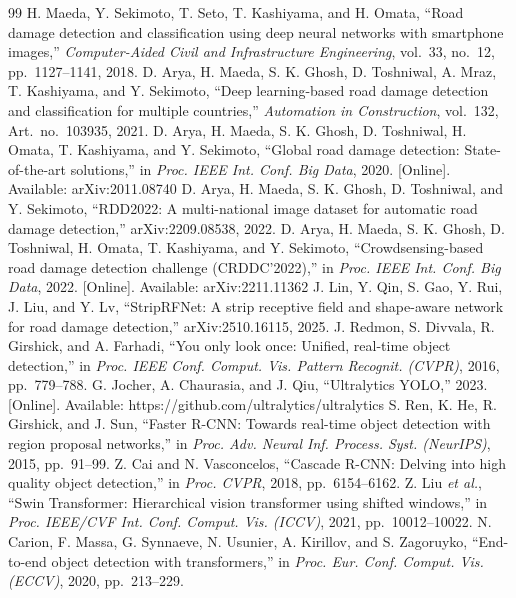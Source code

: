 \IfFileExists{IEEEtran.cls}{\documentclass[conference]{IEEEtran}}%
\begin{document}
\begin{thebibliography}{99}\small
{} H. Maeda, Y. Sekimoto, T. Seto, T. Kashiyama, and H. Omata, ``Road damage detection and classification using deep neural networks with smartphone images,'' \emph{Computer-Aided Civil and Infrastructure Engineering}, vol.~33, no.~12, pp.~1127--1141, 2018.
 D. Arya, H. Maeda, S. K. Ghosh, D. Toshniwal, A. Mraz, T. Kashiyama, and Y. Sekimoto, ``Deep learning-based road damage detection and classification for multiple countries,'' \emph{Automation in Construction}, vol.~132, Art.~no.~103935, 2021.
 D. Arya, H. Maeda, S. K. Ghosh, D. Toshniwal, H. Omata, T. Kashiyama, and Y. Sekimoto, ``Global road damage detection: State-of-the-art solutions,'' in \emph{Proc. IEEE Int. Conf. Big Data}, 2020. [Online]. Available: arXiv:2011.08740
 D. Arya, H. Maeda, S. K. Ghosh, D. Toshniwal, and Y. Sekimoto, ``RDD2022: A multi-national image dataset for automatic road damage detection,'' arXiv:2209.08538, 2022.
 D. Arya, H. Maeda, S. K. Ghosh, D. Toshniwal, H. Omata, T. Kashiyama, and Y. Sekimoto, ``Crowdsensing-based road damage detection challenge (CRDDC'2022),'' in \emph{Proc. IEEE Int. Conf. Big Data}, 2022. [Online]. Available: arXiv:2211.11362
 J. Lin, Y. Qin, S. Gao, Y. Rui, J. Liu, and Y. Lv, ``StripRFNet: A strip receptive field and shape-aware network for road damage detection,'' arXiv:2510.16115, 2025.
 J. Redmon, S. Divvala, R. Girshick, and A. Farhadi, ``You only look once: Unified, real-time object detection,'' in \emph{Proc. IEEE Conf. Comput. Vis. Pattern Recognit. (CVPR)}, 2016, pp.~779--788.
 G. Jocher, A. Chaurasia, and J. Qiu, ``Ultralytics YOLO,'' 2023. [Online]. Available: https://github.com/ultralytics/ultralytics
 S. Ren, K. He, R. Girshick, and J. Sun, ``Faster R-CNN: Towards real-time object detection with region proposal networks,'' in \emph{Proc. Adv. Neural Inf. Process. Syst. (NeurIPS)}, 2015, pp.~91--99.
 Z. Cai and N. Vasconcelos, ``Cascade R-CNN: Delving into high quality object detection,'' in \emph{Proc. CVPR}, 2018, pp.~6154--6162.
 Z. Liu \emph{et al.}, ``Swin Transformer: Hierarchical vision transformer using shifted windows,'' in \emph{Proc. IEEE/CVF Int. Conf. Comput. Vis. (ICCV)}, 2021, pp.~10012--10022.
 N. Carion, F. Massa, G. Synnaeve, N. Usunier, A. Kirillov, and S. Zagoruyko, ``End-to-end object detection with transformers,'' in \emph{Proc. Eur. Conf. Comput. Vis. (ECCV)}, 2020, pp.~213--229.

\end{thebibliography}
\end{document}

